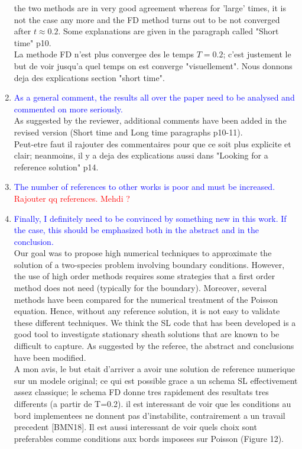 \documentclass{article}
\begin{document}
\begin{enumerate}
the two methods are in very good agreement whereas for 'large' times, it is not the case any more and the FD method 
turns out to be not converged after $t\approx 0.2$. Some explanations are given in the paragraph called "Short time" p10. \\
{\small La methode FD n'est plus convergee des le temps $T=0.2$; c'est justement le but de voir jusqu'a quel temps on est converge "visuellement". Nous donnons deja des explications section "short time".}
    \item \textcolor{blue}{As a general comment, the results all over the paper need to be analysed and
commented on more seriously. }\\
As suggested by the reviewer, additional comments have been added in the revised version (Short time and Long time paragraphs p10-11). \\
{\small Peut-etre faut il rajouter des commentaires pour que ce soit plus explicite et clair; neanmoins, il y a deja des explications aussi dans "Looking for a reference solution" p14. }
    \item \textcolor{blue}{The number of references to other works is poor and must be increased. }\\
 \textcolor{red}{Rajouter qq references. Mehdi ?}\\ 
    \item \textcolor{blue}{Finally, I definitely need to be convinced by something new in this work. If the case, this
should be emphasized both in the abstract and in the conclusion. }\\
Our goal was to propose high numerical techniques to approximate the solution of a two-species problem involving boundary conditions. 
However, the use of high order methods requires some strategies that a first order method does not need (typically for the boundary). 
Moreover, several methods have been compared for the numerical treatment of the Poisson equation. 
Hence, without any reference solution, it is not easy to validate these different techniques.  We think the SL code 
that has been developed is a good tool to investigate stationary sheath solutions that are known to be difficult to capture.  
As suggested by the referee, the abstract and conclusions have been modified. \\
     {\small A mon avis, le but etait d'arriver a avoir une solution de reference numerique sur un modele original; ce qui est possible grace a un schema SL effectivement assez classique; 
le schema FD donne tres rapidement des resultats tres differents (a partir de T=0.2). il est interessant de voir que les
conditions au bord implementees ne donnent pas d'instabilite, contrairement a un travail precedent [BMN18]. Il est  aussi interessant de voir quels choix sont preferables comme conditions aux bords imposees sur Poisson (Figure 12).}
\end{enumerate}
\end{document}
